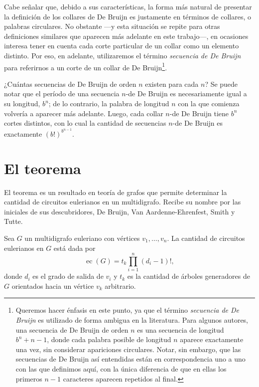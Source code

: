 Cabe señalar que, debido a sus características, la forma más natural de
presentar la definición de los collares de De Bruijn es justamente en términos
de collares, o palabras circulares. No obstante ---y esta situación se repite
para otras definiciones similares que aparecen más adelante en este trabajo---,
en ocasiones interesa tener en cuenta cada corte particular de un collar como
un elemento distinto. Por eso, en adelante, utilizaremos el término
\emph{secuencia de De Bruijn} para referirnos a un corte de un collar de De
Bruijn\footnote{Queremos hacer énfasis en este punto, ya que el término
\emph{secuencia de De Bruijn} es utilizado de forma ambigua en la literatura.
Para algunos autores, una secuencia de De Bruijn de orden $n$ es una secuencia
de longitud $b^n + n - 1$, donde cada palabra posible de longitud $n$ aparece
exactamente una vez, sin considerar apariciones circulares. Notar, sin embargo,
que las secuencias de De Bruijn así entendidas están en correspondencia uno a
uno con las que definimos aquí, con la única diferencia de que en ellas los
primeros $n-1$ caracteres aparecen repetidos al final.}.

¿Cuántas secuencias de De Bruijn de orden $n$ existen para cada $n$? Se puede notar que
el período de una secuencia $n$-de De Bruijn es necesariamente igual a su
longitud, $b^n$; de lo contrario, la palabra de longitud $n$ con la que comienza
volvería a aparecer más adelante. Luego, cada collar $n$-de De Bruijn tiene
$b^n$ cortes distintos, con lo cual la cantidad de secuencias $n$-de De Bruijn
es exactamente $(b!)^{b^{n-1}}$.

\section{El teorema \BEST{}}

El teorema \BEST{} es un resultado en teoría de grafos que permite determinar la
cantidad de circuitos eulerianos en un multidigrafo. Recibe su nombre por las
iniciales de sus descubridores, De Bruijn, Van Aardenne-Ehrenfest, Smith y
Tutte.

\begin{theorem*}[\BEST{}, \pending{[cita]}]
	Sea $G$ un multidigrafo euleriano con vértices $v_1, \dots, v_n$.
	La cantidad de circuitos eulerianos en $G$ está dada por
	\[ \operatorname{ec}(G) = t_k \prod_{i=1}^n (d_i - 1)!, \]
	donde $d_i$ es el grado de salida de $v_i$ y $t_k$ es la cantidad de árboles
	generadores de $G$ orientados hacia un vértice $v_k$ arbitrario.
\end{theorem*}

